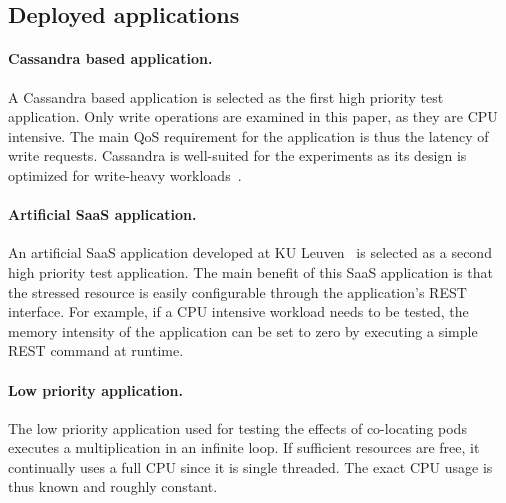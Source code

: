 \subsection{Deployed applications}
\label{test-apps}

\paragraph{Cassandra based application.}
A Cassandra based application is selected as the first high priority test application. Only write operations are examined in this paper, as they are CPU intensive. The main QoS requirement for the application is thus the latency of write requests. Cassandra is well-suited for the experiments as its design is optimized for write-heavy workloads~\citep{scalar}.

\paragraph{Artificial SaaS application.}
\label{setup:saas-app}
An artificial SaaS application developed at KU Leuven~\citep{saas-app} is selected as a second high priority test application. The main benefit of this SaaS application is that the stressed resource is easily configurable through the application's REST interface. For example, if a CPU intensive workload needs to be tested, the memory intensity of the application can be set to zero by executing a simple REST command at runtime. 

\paragraph{Low priority application.}
\label{setup:lpp}
The low priority application used for testing the effects of co-locating pods executes a multiplication in an infinite loop. If sufficient resources are free, it continually uses a full CPU since it is single threaded. The exact CPU usage is thus known and roughly constant.
